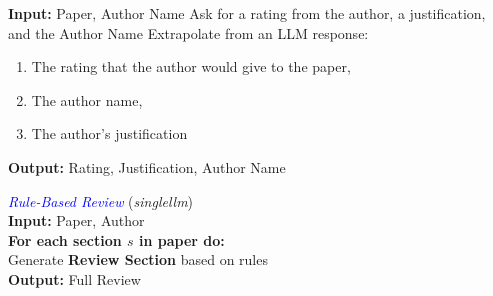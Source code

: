 \documentclass{article} %
\begin{document}
\begin{minipage}[t]{0.52\textwidth}
\begin{algorithmic}[1]
    \STATE \textbf{Input:} Paper, Author Name
    \STATE Ask for a rating from the author, a justification, and the Author Name
    \STATE Extrapolate from an LLM response:
    \begin{enumerate}
        \item The rating that the author would give to the paper,
        \item The author name,
        \item The author’s justification
    \end{enumerate}
    \STATE \textbf{Output:} Rating, Justification, Author Name
\end{algorithmic}
\label{alg:author-summarize}
\end{minipage}
\hfill
\begin{minipage}[t]{0.45\textwidth}
\textcolor{blue}{\textit{Rule-Based Review}} (\textit{singlellm}) \\[0.5em]
\textcolor{myyellow}{\textbf{Input:}} Paper, Author \\[0.3em]
\textbf{For each section $s$ in paper do:} \\
\quad Generate \textcolor{myyellow}{\textbf{Review Section}} based on rules \\[0.5em]
\textcolor{myyellow}{\textbf{Output:}} Full Review
\label{alg:single-llm}
\end{minipage}


\vspace{1.5em}
\end{document}
